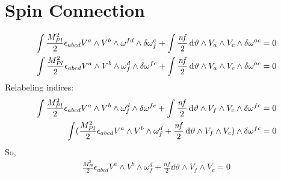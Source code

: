 \documentclass[12pt]{article}
\begin{document}
\section{Spin Connection}
\begin{align*}
  \int \frac{M_{Pl}^2}{2} \epsilon_{abcd} V^a \wedge V^b \wedge \omega^{fd} \wedge \var{\omega^c_f} + \int \frac{\mathit{nf}}{2} \dd{\vartheta} \wedge V_a \wedge V_c \wedge \var{\omega^{ac}} = 0 \\
  \int \frac{M_{Pl}^2}{2} \epsilon_{abcd} V^a \wedge V^b \wedge \omega_f^d \wedge \var{\omega^{fc}} + \int \frac{\mathit{nf}}{2} \dd{\vartheta} \wedge V_a \wedge V_c \wedge \var{\omega^{ac}} = 0
\end{align*}
Relabeling indices:
\begin{align*}
  \int \frac{M_{Pl}^2}{2} \epsilon_{abcd} V^a \wedge V^b \wedge \omega_f^d \wedge \var{\omega^{fc}} + \int \frac{\mathit{nf}}{2} \dd{\vartheta} \wedge V_f \wedge V_c \wedge \var{\omega^{fc}} = 0 \\
  \int (\frac{M_{Pl}^2}{2} \epsilon_{abcd} V^a \wedge V^b \wedge \omega_f^d + \frac{\mathit{nf}}{2} \dd{\vartheta} \wedge V_f \wedge V_c) \wedge \var{\omega^{fc}} = 0 \\
\end{align*}
So,
\begin{align*}
  \frac{M_{Pl}^2}{2} \epsilon_{abcd} V^a \wedge V^b \wedge \omega_f^d + \frac{\mathit{nf}}{2} \dd{\vartheta} \wedge V_f \wedge V_c = 0
\end{align*}
\end{document}
